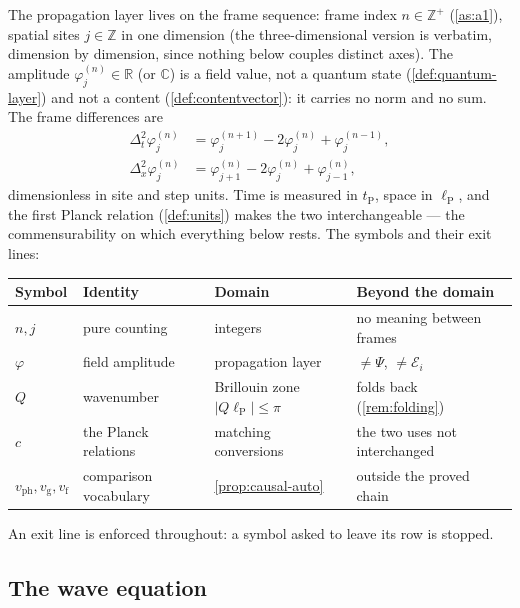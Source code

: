 \documentclass[11pt]{amsbook}
\theoremstyle{plain}
\theoremstyle{definition}
\theoremstyle{remark}
\begin{document}
The propagation layer lives on the frame sequence: frame index $n \in \mathbb{Z}^{+}$ (\cref{as:a1}), spatial sites $j \in \mathbb{Z}$ in one dimension (the three-dimensional version is verbatim, dimension by dimension, since nothing below couples distinct axes). The amplitude $\varphi_{j}^{(n)} \in \mathbb{R}$ (or $\mathbb{C}$) is a field value, not a quantum state (\cref{def:quantum-layer}) and not a content (\cref{def:contentvector}): it carries no norm and no sum. The frame differences are
\begin{equation}\label{eq:frame-diff}
\begin{aligned}
\Delta_{t}^{2}\varphi_{j}^{(n)} &= \varphi_{j}^{(n+1)} - 2\varphi_{j}^{(n)} + \varphi_{j}^{(n-1)},\\
\Delta_{x}^{2}\varphi_{j}^{(n)} &= \varphi_{j+1}^{(n)} - 2\varphi_{j}^{(n)} + \varphi_{j-1}^{(n)},
\end{aligned}
\end{equation}
dimensionless in site and step units. Time is measured in $t_{\mathrm P}$, space in $\ell_{\mathrm P}$, and the first Planck relation (\cref{def:units}) makes the two interchangeable --- the commensurability on which everything below rests. The symbols and their exit lines:
\begin{center}
\begin{tabular}{@{}p{2.2cm}p{2.2cm}p{3.4cm}p{3.0cm}@{}}
\toprule
Symbol & Identity & Domain & Beyond the domain \\
\midrule
$n, j$ & pure counting & integers & no meaning between frames \\
$\varphi$ & field amplitude & propagation layer & $\neq \Psi$, $\neq \mathcal E_{i}$ \\
$Q$ & wavenumber & Brillouin zone $|Q\ell_{\mathrm P}| \leq \pi$ & folds back (\cref{rem:folding}) \\
$c$ & the Planck relations & matching conversions & the two uses not interchanged \\
$v_{\mathrm{ph}}, v_{\mathrm{g}}, v_{\mathrm{f}}$ & comparison vocabulary & \cref{prop:causal-auto} & outside the proved chain \\
\bottomrule
\end{tabular}
\end{center}
An exit line is enforced throughout: a symbol asked to leave its row is stopped.

\subsection{The wave equation}\label{sec:wave-eq}
\end{document}
